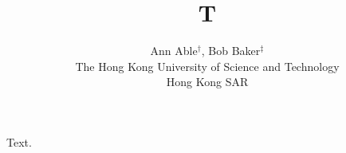 \documentclass{article}
\begin{document}
\title{T}
\author{Ann Able$^{\dag}$, Bob Baker$^{\ddag}$\\ The Hong Kong University of Science and Technology\\ Hong Kong SAR}
\maketitle
Text.
\end{document}
